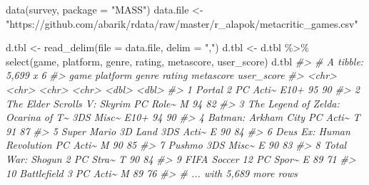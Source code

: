 \documentclass[
]{book}
\newenvironment{Shaded}{\begin{snugshade}}{\end{snugshade}}
\newcommand{\AttributeTok}[1]{\textcolor[rgb]{0.77,0.63,0.00}{#1}}
\newcommand{\CommentTok}[1]{\textcolor[rgb]{0.56,0.35,0.01}{\textit{#1}}}
\newcommand{\FunctionTok}[1]{\textcolor[rgb]{0.00,0.00,0.00}{#1}}
\newcommand{\NormalTok}[1]{#1}
\newcommand{\OtherTok}[1]{\textcolor[rgb]{0.56,0.35,0.01}{#1}}
\newcommand{\SpecialCharTok}[1]{\textcolor[rgb]{0.00,0.00,0.00}{#1}}
\newcommand{\StringTok}[1]{\textcolor[rgb]{0.31,0.60,0.02}{#1}}
\begin{document}
\begin{Shaded}
\begin{Highlighting}[]
\FunctionTok{data}\NormalTok{(survey, }\AttributeTok{package =} \StringTok{"MASS"}\NormalTok{)}
\NormalTok{data.file }\OtherTok{\textless{}{-}} \StringTok{"https://github.com/abarik/rdata/raw/master/r\_alapok/metacritic\_games.csv"}

\NormalTok{d.tbl }\OtherTok{\textless{}{-}} \FunctionTok{read\_delim}\NormalTok{(}\AttributeTok{file =}\NormalTok{ data.file, }\AttributeTok{delim =} \StringTok{","}\NormalTok{)}
\NormalTok{d.tbl }\OtherTok{\textless{}{-}}\NormalTok{ d.tbl }\SpecialCharTok{\%\textgreater{}\%} \FunctionTok{select}\NormalTok{(game, platform, genre, rating, metascore, user\_score)}
\NormalTok{d.tbl}
\CommentTok{\#\textgreater{} \# A tibble: 5,699 x 6}
\CommentTok{\#\textgreater{}    game                               platform genre rating metascore user\_score}
\CommentTok{\#\textgreater{}    \textless{}chr\textgreater{}                              \textless{}chr\textgreater{}    \textless{}chr\textgreater{} \textless{}chr\textgreater{}      \textless{}dbl\textgreater{}      \textless{}dbl\textgreater{}}
\CommentTok{\#\textgreater{}  1 Portal 2                           PC       Acti\textasciitilde{} E10+          95         90}
\CommentTok{\#\textgreater{}  2 The Elder Scrolls V: Skyrim        PC       Role\textasciitilde{} M             94         82}
\CommentTok{\#\textgreater{}  3 The Legend of Zelda: Ocarina of T\textasciitilde{} 3DS      Misc\textasciitilde{} E10+          94         90}
\CommentTok{\#\textgreater{}  4 Batman: Arkham City                PC       Acti\textasciitilde{} T             91         87}
\CommentTok{\#\textgreater{}  5 Super Mario 3D Land                3DS      Acti\textasciitilde{} E             90         84}
\CommentTok{\#\textgreater{}  6 Deus Ex: Human Revolution          PC       Acti\textasciitilde{} M             90         85}
\CommentTok{\#\textgreater{}  7 Pushmo                             3DS      Misc\textasciitilde{} E             90         83}
\CommentTok{\#\textgreater{}  8 Total War: Shogun 2                PC       Stra\textasciitilde{} T             90         84}
\CommentTok{\#\textgreater{}  9 FIFA Soccer 12                     PC       Spor\textasciitilde{} E             89         71}
\CommentTok{\#\textgreater{} 10 Battlefield 3                      PC       Acti\textasciitilde{} M             89         76}
\CommentTok{\#\textgreater{} \# ... with 5,689 more rows}


\end{Highlighting}
\end{Shaded}
\end{document}
